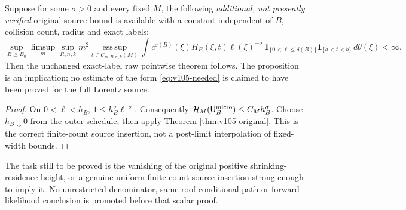 \begin{proposition}
\label{prop:v105-insertion}
Suppose for some $\sigma>0$ and every fixed $M$, the
following \emph{additional, not presently verified} original-source
bound is available with a constant independent of $B$,
collision count, radius and exact labels:
\begin{equation}\label{eq:v105-needed}
\sup_{B\ge B_0}\limsup_m\sup_{R,n,k}m^2
\operatorname*{ess\,sup}_{t\in\mathcal C_{m,R,n,k}(M)}
\int c^{\varepsilon(B)}(\xi)H_B(\xi,t)
 \ell(\xi)^{-\sigma}\,
 \mathbf1_{\{0<\ell\le\delta(B)\}}
 \mathbf1_{\{a<t<b\}}\,d\theta(\xi)<\infty.
\end{equation}
Then the unchanged exact-label raw pointwise theorem follows.
The proposition is an implication; no estimate of the form
\eqref{eq:v105-needed} is claimed to have been proved for the
full Lorentz source.
\end{proposition}
\begin{proof}
On $0<\ell<h_B$, $1\le h_B^\sigma\ell^{-\sigma}$.
Consequently $\mathcal H_M(\mathsf U_B^{\rm micro})
\le C_Mh_B^\sigma$. Choose $h_B\downarrow0$ from
the outer schedule; then apply Theorem \ref{thm:v105-original}.
This is the correct finite-count source insertion, not a
post-limit interpolation of fixed-width bounds.
\end{proof}
The task still to be proved is the vanishing of the
original positive shrinking-residence height, or a genuine
uniform finite-count source insertion strong enough to imply it.
No unrestricted denominator, same-roof conditional path
or forward likelihood conclusion is promoted before that
scalar proof.
